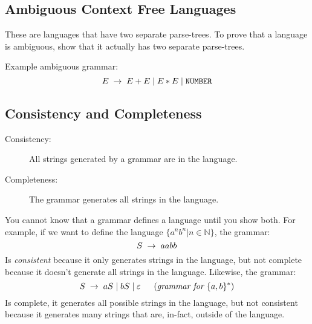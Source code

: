 \subsection{Ambiguous Context Free Languages}
These are languages that have two separate parse-trees. To prove
that a language is ambiguous, show that it actually has two separate
parse-trees.

Example ambiguous grammar:
\[
    E \;\to\; E + E \;|\; E * E \;|\; \texttt{NUMBER}
\]

\subsection{Consistency and Completeness}
\begin{description}
    \item[{\small Consistency:}] All strings generated by a grammar are 
    in the language.
    \item[{\small Completeness:}] The grammar generates all strings 
    in the language.
\end{description}

You cannot know that a grammar defines a language until you show both.
For example, if we want to define the language $\{a^nb^n | n \in \mathbb{N}\}$,
the grammar:
\[
    S \;\to\; aabb
\]
Is \textit{consistent} because it only generates strings in the language,
but not complete because it doesn't generate all strings in the language.
Likewise, the grammar:
\[
    S \;\to\; aS \;|\; bS \;|\; \varepsilon 
    \;\;\quad (\textit{grammar for }\{a, b\}^*)
\]
Is complete, it generates all possible strings in the language, but not
consistent because it generates many strings that are, in-fact, outside of
the language.
